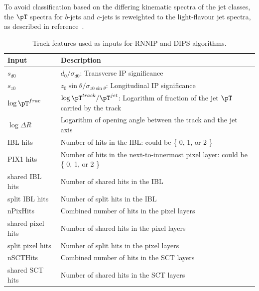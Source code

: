 
To avoid classification based on the differing kinematic spectra of the jet classes, the $\pT$ spectra for $b$-jets and $c$-jets is reweighted to the light-flavour jet spectra, as described in reference~\cite{ATL-PHYS-PUB-2017-003}.

\begin{table}[h!]
  \centering
    \begin{tabular}{l | l } %
      \textbf{Input} & \textbf{Description}  \\
      \hline
      \hline
  $s_{d0}$ & $d_0 / \sigma_{d0}$: Transverse IP significance \\
	$s_{z0}$ & $z_0 \sin \theta / \sigma_{z0 \sin \theta}$: Longitudinal IP significance \\
	$\log \pT^{frac}$ & $\log \pT^{track} / \pT^{jet}$: Logarithm of fraction of the jet $\pT$ carried by the track \\
	$\log \Delta R$ & Logarithm of opening angle between the track and the jet axis \\
	IBL hits & Number of hits in the IBL: could be \{ 0, 1, or 2 \} \\
	PIX1 hits & Number of hits in the next-to-innermost pixel layer: could be \{ 0, 1, or 2 \} \\
	shared IBL hits & Number of shared hits in the IBL \\
	split IBL hits & Number of split hits in the IBL \\
	nPixHits & Combined number of  hits in the pixel layers \\
	shared pixel hits & Number of shared hits in the pixel layers \\
	split pixel hits &  Number of split hits in the pixel layers \\
	nSCTHits  & Combined number of hits in the SCT layers \\
	shared SCT hits & Number of shared hits in the SCT layers \\
    \end{tabular}
    \caption{Track features used as inputs for RNNIP and DIPS algorithms.}
    \label{table:inputs}
\end{table}


